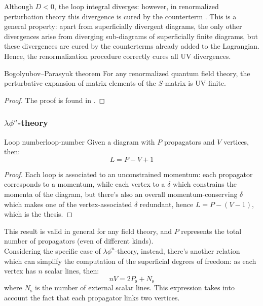 Although $ D < 0 $, the loop integral diverges: however, in renormalized perturbation theory this divergence is cured by the counterterm . This is a general property: apart from superficially divergent diagrams, the only other divergences arise from diverging sub-diagrams of superficially finite diagrams, but these divergences are cured by the counterterms already added to the Lagrangian. Hence, the renormalization procedure correctly cures all UV divergences.

\begin{theorem}{Bogolyubov--Parasyuk theorem}{}
  For any renormalized quantum field theory, the perturbative expansion of matrix elements of the $ S $-matrix is UV-finite.
\end{theorem}

\begin{proofbox}
  \begin{proof}
    The proof is found in \cite{bog-par, azp}.
  \end{proof}
\end{proofbox}

\subsubsection{\texorpdfstring{$ \lambda \phi^n $}{λφn}-theory}

\begin{lemma}{Loop number}{loop-number}
  Given a diagram with $ P $ propagators and $ V $ vertices, then:
  \begin{equation}
    L = P - V + 1
    \label{eq:loop-num}
  \end{equation}
\end{lemma}

\begin{proofbox}
  \begin{proof}
    Each loop is associated to an unconstrained momentum: each propagator corresponds to a momentum, while each vertex to a $ \delta $ which constrains the momenta of the diagram, but there's also an overall momentum-conserving $ \delta $ which makes one of the vertex-associated $ \delta $ redundant, hence $ L = P - (V - 1) $, which is the thesis.
  \end{proof}
\end{proofbox}

This result is valid in general for any field theory, and $ P $ represents the total number of propagators (even of different kinds). \\
Considering the specific case of $ \lambda \phi^n $-theory, instead, there's another relation which can simplify the computation of the superficial degrees of freedom: as each vertex has $ n $ scalar lines, then:
\begin{equation}
  n V = 2 P_\text{s} + N_\text{s}
  \label{eq:fn-v}
\end{equation}
where $ N_\text{s} $ is the number of external scalar lines. This expression takes into account the fact that each propagator links two vertices.

